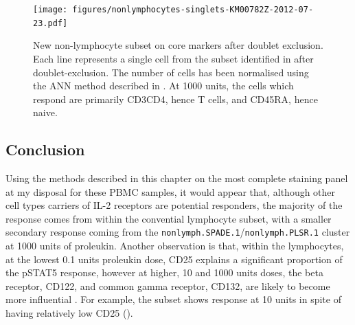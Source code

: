 \begin{figure}
\begin{minipage}{.65\textwidth}
    \texttt{[image: figures/nonlymphocytes-singlets-KM00782Z-2012-07-23.pdf]}
\end{minipage}
\begin{minipage}{.3\textwidth}
{ New non-lymphocyte subset on core markers after doublet exclusion. } 
{
Each line represents a single cell from the subset identified in  after doublet-exclusion.
The number of cells has been normalised using the \gls{ANN} method described in .
At 1000 units, the cells which respond are primarily CD3\positive CD4\positive, hence T cells, and CD45RA\positive, hence naive.
}
\end{minipage}
\end{figure}

\subsection{Conclusion}

Using the methods described in this chapter on the most complete staining panel at my disposal for these \gls{PBMC} samples, it would appear that, although other cell types carriers of IL-2 receptors are potential responders, the majority of the response comes from within the convential lymphocyte subset, with a smaller secondary response coming from the \texttt{nonlymph.SPADE.1}/\texttt{nonlymph.PLSR.1} cluster at 1000 units of proleukin.
Another observation is that, within the lymphocytes, at the lowest 0.1 units proleukin dose, CD25 explains a significant proportion of the pSTAT5 response, however at higher, 10 and 1000 units doses, the beta receptor, CD122, and common gamma receptor, CD132, are likely to become more influential \citep{Pekalski:2013ga}.
For example, the \high subset
shows response at 10 units in spite of having relatively low CD25 ().

